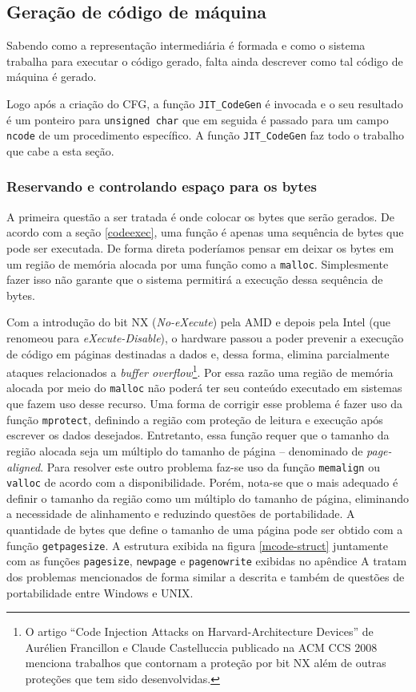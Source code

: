 \subsection{Geração de código de máquina}
\label{codegen}
Sabendo como a representação intermediária é formada e como o sistema
trabalha para executar o código gerado, falta ainda descrever como tal
código de máquina é gerado.

Logo após a criação do CFG, a função \verb!JIT_CodeGen! é invocada e o
seu resultado é um ponteiro para \verb!unsigned char! que em seguida é
passado para um campo \verb!ncode! de um procedimento específico. A
função \verb!JIT_CodeGen! faz todo o trabalho que cabe a
esta seção.

\subsubsection{Reservando e controlando espaço para os bytes}
A primeira questão a ser tratada é onde colocar os bytes que serão
gerados. De acordo com a seção \ref{codeexec}, uma função é apenas uma
sequência de bytes que pode ser executada. De forma direta poderíamos
pensar em deixar os bytes em um região de memória alocada por
uma função como a \verb!malloc!. Simplesmente fazer isso não garante
que o sistema permitirá a execução dessa sequência de bytes.

Com a introdução do bit NX (\textit{No-eXecute}) pela AMD e depois
pela Intel (que renomeou para \textit{eXecute-Disable}), o hardware
passou a poder prevenir a execução de código em páginas destinadas a
dados \cite[seção 5.13]{intel_prog} e, dessa forma, elimina
parcialmente ataques relacionados a \textit{buffer
  overflow}\footnote{O artigo ``Code Injection Attacks on
  Harvard-Architecture Devices'' de Aurélien Francillon e Claude
  Castelluccia publicado na ACM CCS 2008 menciona trabalhos que
  contornam a proteção por bit NX além de outras proteções que
  tem sido desenvolvidas.}.
Por essa razão uma região de
memória alocada por meio do \verb!malloc! não poderá ter seu conteúdo
executado em sistemas que fazem uso desse recurso. Uma forma de
corrigir esse problema é fazer uso da função \verb!mprotect!,
definindo a região com proteção de leitura e execução após escrever os dados
desejados. Entretanto, essa função requer que o tamanho da região
alocada seja um múltiplo do tamanho de página -- denominado de
\textit{page-aligned}. Para resolver este outro problema faz-se uso da função
\verb!memalign! ou \verb!valloc! de acordo com a disponibilidade. Porém, nota-se que
o mais adequado é definir o tamanho da região como um múltiplo do
tamanho de página, eliminando a necessidade de alinhamento e reduzindo
questões de portabilidade. A quantidade de bytes que define o tamanho
de uma página pode ser obtido com a função
\verb!getpagesize!. A estrutura exibida na figura \ref{mcode-struct}
juntamente com as funções \verb!pagesize!, \verb!newpage! e
\verb!pagenowrite! exibidas no apêndice A
tratam dos problemas mencionados de forma similar a descrita e também
de questões de portabilidade entre Windows e UNIX.

